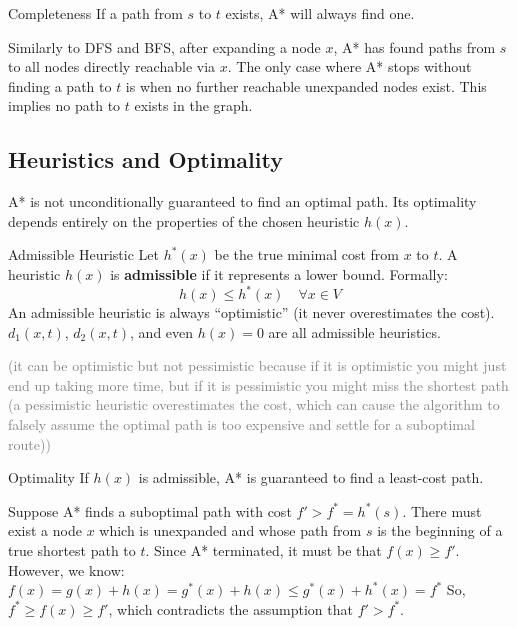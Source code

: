 \documentclass[a4paper, 11pt]{report}
\begin{document}
\begin{thmframe}{Completeness}{}
    If a path from $s$ to $t$ exists, A* will always find one.
\end{thmframe}
\begin{proofframe}
    Similarly to DFS and BFS, after expanding a node $x$, A* has found paths from $s$ to all nodes directly reachable via $x$. The only case where A* stops without finding a path to $t$ is when no further reachable unexpanded nodes exist. This implies no path to $t$ exists in the graph.
\end{proofframe}

\subsection{Heuristics and Optimality}
A* is not unconditionally guaranteed to find an optimal path. Its optimality depends entirely on the properties of the chosen heuristic $h(x)$.

\begin{defframe}{Admissible Heuristic}{}
    Let $h^*(x)$ be the true minimal cost from $x$ to $t$. A heuristic $h(x)$ is \textbf{admissible} if it represents a lower bound. Formally:
    $$h(x) \le h^*(x) \quad \forall x \in V$$
    An admissible heuristic is always ``optimistic'' (it never overestimates the cost). $d_1(x,t)$, $d_2(x,t)$, and even $h(x)=0$ are all admissible heuristics.

    \textcolor{gray}{(it can be optimistic but not pessimistic because if it is optimistic you might just end up taking more time, but if it is pessimistic you might miss the shortest path (a pessimistic heuristic overestimates the cost, which can cause the algorithm to falsely assume the optimal path is too expensive and settle for a suboptimal route))}
\end{defframe}

\begin{thmframe}{Optimality}{}
    If $h(x)$ is admissible, A* is guaranteed to find a least-cost path.
\end{thmframe}
\begin{proofframe}
    Suppose A* finds a suboptimal path with cost $f' > f^* = h^*(s)$. 
    There must exist a node $x$ which is unexpanded and whose path from $s$ is the beginning of a true shortest path to $t$.
    Since A* terminated, it must be that $f(x) \ge f'$.
    However, we know:
    $f(x) = g(x) + h(x) = g^*(x) + h(x) \le g^*(x) + h^*(x) = f^*$
    So, $f^* \ge f(x) \ge f'$, which contradicts the assumption that $f' > f^*$.
\end{proofframe}
\end{document}
